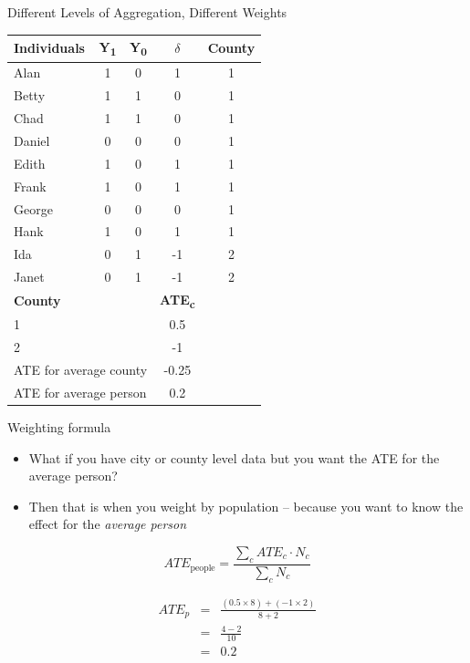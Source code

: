 \documentclass{beamer}
\begin{document}
\begin{frame}{Different Levels of Aggregation, Different Weights}

\begin{table}[htbp]\centering
\footnotesize
\begin{tabular}{lcccc}
\toprule
\textbf{Individuals} & \textbf{Y\textsubscript{1}} & \textbf{Y\textsubscript{0}} & \textbf{$\delta$} & \textbf{County} \\
\midrule
Alan    & 1 & 0 & 1  & \cellcolor{yellow!30}1 \\
Betty   & 1 & 1 & 0  & \cellcolor{yellow!30}1 \\
Chad    & 1 & 1 & 0  & \cellcolor{yellow!30}1 \\
Daniel  & 0 & 0 & 0  & \cellcolor{yellow!30}1 \\
Edith   & 1 & 0 & 1  & \cellcolor{yellow!30}1 \\
Frank   & 1 & 0 & 1  & \cellcolor{yellow!30}1 \\
George  & 0 & 0 & 0  & \cellcolor{yellow!30}1 \\
Hank    & 1 & 0 & 1  & \cellcolor{yellow!30}1 \\
Ida     & 0 & 1 & -1 & \cellcolor{green!20}2 \\
Janet   & 0 & 1 & -1 & \cellcolor{green!20}2 \\
\midrule
\textbf{County} & & & \textbf{ATE\textsubscript{c}} & \\
\cellcolor{yellow!30}1 & & & \cellcolor{yellow!30}0.5 & \\
\cellcolor{green!20}2 & & & \cellcolor{green!20}-1 & \\
\midrule
\multicolumn{3}{l}{ATE for average county} & -0.25 & \\
\multicolumn{3}{l}{ATE for average person}   & 0.2 & \\
\bottomrule
\end{tabular}
\end{table}


\end{frame}

\begin{frame}{Weighting formula}

\begin{itemize}
\item What if you have city or county level data but you want the ATE for the average person? 
\item Then that is when you weight by population -- because you want to know the effect for the \emph{average person}
\end{itemize}

\begin{equation}
ATE_{\text{people}} = \frac{\sum_c ATE_c \cdot N_c}{\sum_c N_c}
\end{equation}

\begin{eqnarray*}
ATE_p &=& \frac{(0.5 \times 8) + (-1 \times 2)}{8 + 2} \\
      &=& \frac{4 - 2}{10} \\
      &=& 0.2
\end{eqnarray*}

\end{frame}
\end{document}
